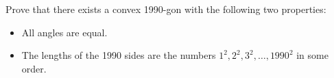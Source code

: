 Prove that there exists a convex 1990-gon with the following two properties:

\begin{itemize}
	\item All angles are equal.
	\item The lengths of the 1990 sides are the numbers $ 1^2, 2^2, 3^2, \dots, 1990^2$ in some order.
\end{itemize}
